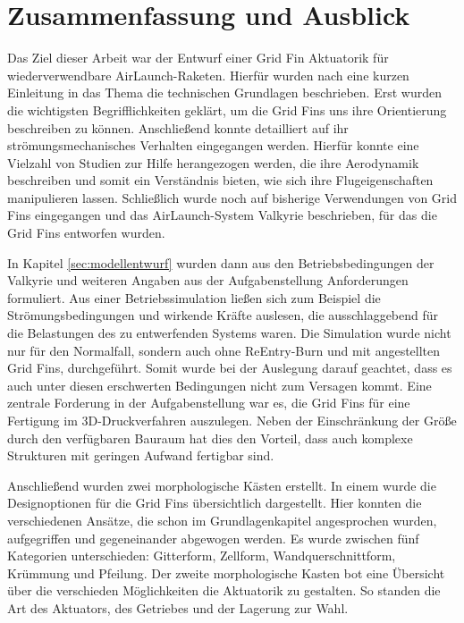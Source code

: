 \chapter{Zusammenfassung und Ausblick}
Das Ziel dieser Arbeit war der Entwurf einer Grid Fin Aktuatorik für wiederverwendbare AirLaunch-Raketen. Hierfür wurden nach eine kurzen Einleitung in das Thema die technischen Grundlagen beschrieben. Erst wurden die wichtigsten Begrifflichkeiten geklärt, um die Grid Fins uns ihre Orientierung beschreiben zu können. Anschließend konnte detailliert auf ihr strömungsmechanisches Verhalten eingegangen werden. Hierfür konnte eine Vielzahl von Studien zur Hilfe herangezogen werden, die ihre Aerodynamik beschreiben und somit ein Verständnis bieten, wie sich ihre Flugeigenschaften manipulieren lassen. Schließlich wurde noch auf bisherige Verwendungen von Grid Fins eingegangen und das AirLaunch-System Valkyrie beschrieben, für das die Grid Fins entworfen wurden.

In Kapitel \ref{sec:modellentwurf} wurden dann aus den Betriebsbedingungen der Valkyrie und weiteren Angaben aus der Aufgabenstellung Anforderungen formuliert. Aus einer Betriebssimulation ließen sich zum Beispiel die Strömungsbedingungen und wirkende Kräfte auslesen, die ausschlaggebend für die Belastungen des zu entwerfenden Systems waren. Die Simulation wurde nicht nur für den Normalfall, sondern auch ohne ReEntry-Burn und mit angestellten Grid Fins, durchgeführt. Somit wurde bei der Auslegung darauf geachtet, dass es auch unter diesen erschwerten Bedingungen nicht zum Versagen kommt. Eine zentrale Forderung in der Aufgabenstellung war es, die Grid Fins für eine Fertigung im 3D-Druckverfahren auszulegen. Neben der Einschränkung der Größe durch den verfügbaren Bauraum hat dies den Vorteil, dass auch komplexe Strukturen mit geringen Aufwand fertigbar sind.

Anschließend wurden zwei morphologische Kästen erstellt. In einem wurde die Designoptionen für die Grid Fins übersichtlich dargestellt. Hier konnten die verschiedenen Ansätze, die schon im Grundlagenkapitel angesprochen wurden, aufgegriffen und gegeneinander abgewogen werden. Es wurde zwischen fünf Kategorien unterschieden: Gitterform, Zellform, Wandquerschnittform, Krümmung und Pfeilung. Der zweite morphologische Kasten bot eine Übersicht über die verschieden Möglichkeiten die Aktuatorik zu gestalten. So standen die Art des Aktuators, des Getriebes und der Lagerung zur Wahl.

